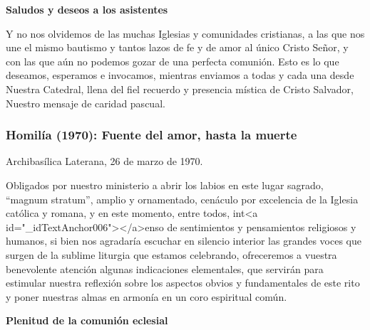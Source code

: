 			\begin{bodycenter}\textbf{Saludos y deseos a los asistentes }\end{bodycenter}
			
			\begin{body}Y no nos olvidemos de las muchas Iglesias y comunidades cristianas, a las que nos une el mismo bautismo y tantos lazos de fe y de amor al único Cristo Señor, y con las que aún no podemos gozar de una perfecta comunión. Esto es lo que deseamos, esperamos e invocamos, mientras enviamos a todas y cada una desde Nuestra Catedral, llena del fiel recuerdo y presencia mística de Cristo Salvador, Nuestro mensaje de caridad pascual. \end{body}
			
			\begin{body}[...]\end{body}
			
			\subsubsection{Homilía (1970): Fuente del amor, hasta la muerte}
			
			\begin{referencia}Archibasílica Laterana, 26 de marzo de 1970.\end{referencia}
			
			\begin{body}Obligados por nuestro ministerio a abrir los labios en este lugar sagrado, “magnum stratum”, amplio y ornamentado, cenáculo por excelencia de la Iglesia católica y romana, y en este momento, entre todos, int<a id="_idTextAnchor006"></a>enso de sentimientos y pensamientos religiosos y humanos, si bien nos agradaría escuchar en silencio interior las grandes voces que surgen de la sublime liturgia que estamos celebrando, ofreceremos a vuestra benevolente atención algunas indicaciones elementales, que servirán para estimular nuestra reflexión sobre los aspectos obvios y fundamentales de este rito y poner nuestras almas en armonía en un coro espiritual común. \end{body}
			
			\begin{bodycenter}\textbf{Plenitud de la comunión eclesial }\end{bodycenter}
			
